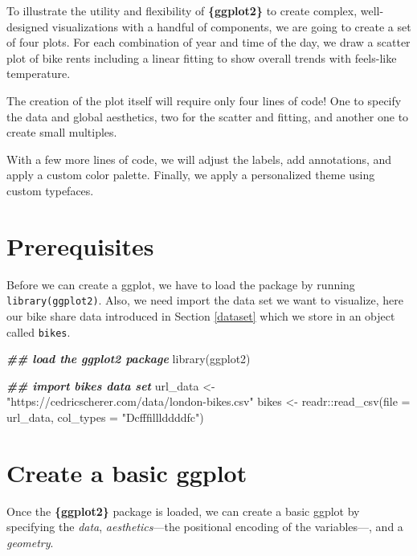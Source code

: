 \documentclass[
]{krantz}
\makeatletter
\newenvironment{Shaded}{\begin{snugshade}}{\end{snugshade}}
\newcommand{\AttributeTok}[1]{\textcolor[rgb]{0.61,0.61,0.61}{#1}}
\newcommand{\DocumentationTok}[1]{\textcolor[rgb]{0.37,0.37,0.37}{\textbf{\textit{#1}}}}
\newcommand{\FunctionTok}[1]{\textcolor[rgb]{0,0,0}{#1}}
\newcommand{\NormalTok}[1]{#1}
\newcommand{\OtherTok}[1]{\textcolor[rgb]{0.37,0.37,0.37}{#1}}
\newcommand{\SpecialCharTok}[1]{\textcolor[rgb]{0,0,0}{#1}}
\newcommand{\StringTok}[1]{\textcolor[rgb]{0.5,0.5,0.5}{#1}}
\newenvironment{kframe}{%
\medskip{}
\setlength{\fboxsep}{.8em}
 \def\at@end@of@kframe{}%
 \ifinner\ifhmode%
  \def\at@end@of@kframe{\end{minipage}}%
  \begin{minipage}{\columnwidth}%
 \fi\fi%
 \def\FrameCommand##1{\hskip\@totalleftmargin \hskip-\fboxsep
 \colorbox{shadecolor}{##1}\hskip-\fboxsep
     \hskip-\linewidth \hskip-\@totalleftmargin \hskip\columnwidth}%
 \MakeFramed {\advance\hsize-\width
   \@totalleftmargin\z@ \linewidth\hsize
   \@setminipage}}%
 {\par\unskip\endMakeFramed%
 \at@end@of@kframe}
\renewenvironment{Shaded}{\begin{kframe}}{\end{kframe}}
\makeatother
\begin{document}
To illustrate the utility and flexibility of \textbf{\{ggplot2\}} to create complex, well-designed visualizations with a handful of components, we are going to create a set of four plots. For each combination of year and time of the day, we draw a scatter plot of bike rents including a linear fitting to show overall trends with feels-like temperature.

The creation of the plot itself will require only four lines of code! One to specify the data and global aesthetics, two for the scatter and fitting, and another one to create small multiples.

With a few more lines of code, we will adjust the labels, add annotations, and apply a custom color palette. Finally, we apply a personalized theme using custom typefaces.

\hypertarget{prep-ggplot}{%
\section{Prerequisites}\label{prep-ggplot}}

Before we can create a ggplot, we have to load the package by running \texttt{library(ggplot2)}. Also, we need import the data set we want to visualize, here our bike share data introduced in Section \ref{dataset} which we store in an object called \texttt{bikes}.

\begin{Shaded}
\begin{Highlighting}[]
\DocumentationTok{\#\# load the ggplot2 package}
\FunctionTok{library}\NormalTok{(ggplot2)}

\DocumentationTok{\#\# import bikes data set}
\NormalTok{url\_data }\OtherTok{\textless{}{-}} \StringTok{"https://cedricscherer.com/data/london{-}bikes.csv"}
\NormalTok{bikes }\OtherTok{\textless{}{-}}\NormalTok{ readr}\SpecialCharTok{::}\FunctionTok{read\_csv}\NormalTok{(}\AttributeTok{file =}\NormalTok{ url\_data, }\AttributeTok{col\_types =} \StringTok{"Dcfffilllddddfc"}\NormalTok{)}
\end{Highlighting}
\end{Shaded}

\hypertarget{basics}{%
\section{Create a basic ggplot}\label{basics}}

Once the \textbf{\{ggplot2\}} package is loaded, we can create a basic ggplot by specifying the \emph{data}, \emph{aesthetics}---the positional encoding of the variables---, and a \emph{geometry}.
\end{document}
